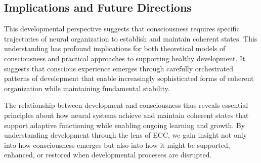\subsection*{Implications and Future Directions}

This developmental perspective suggests that consciousness requires specific trajectories of neural organization to establish and maintain coherent states. This understanding has profound implications for both theoretical models of consciousness and practical approaches to supporting healthy development. It suggests that conscious experience emerges through carefully orchestrated patterns of development that enable increasingly sophisticated forms of coherent organization while maintaining fundamental stability.

The relationship between development and consciousness thus reveals essential principles about how neural systems achieve and maintain coherent states that support adaptive functioning while enabling ongoing learning and growth. By understanding development through the lens of ECC, we gain insight not only into how consciousness emerges but also into how it might be supported, enhanced, or restored when developmental processes are disrupted.
